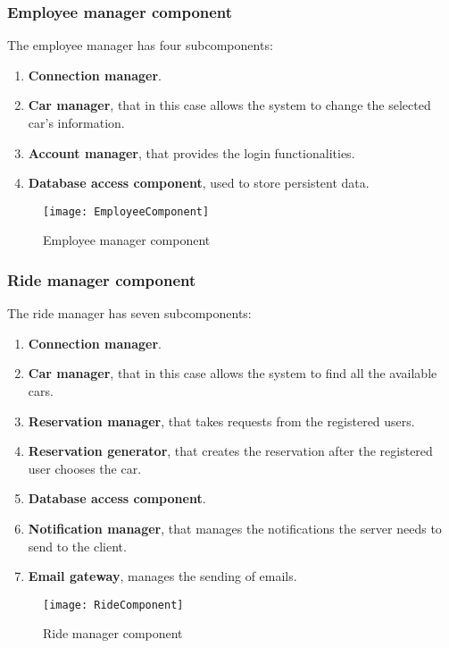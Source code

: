\subsubsection{Employee manager component}
The employee manager has four subcomponents:
\begin{enumerate}
	\item \textbf{Connection manager}.
	\item \textbf{Car manager}, that in this case allows the system to change the selected car's information.
	\item \textbf{Account manager}, that provides the login functionalities.
	\item \textbf{Database access component}, used to store persistent data.
\end{enumerate}
\begin{figure}[H]
	\centering
	\texttt{[image: EmployeeComponent]}
	\caption{Employee manager component}
\end{figure}
\newpage
\subsubsection{Ride manager component}
The ride manager has seven subcomponents:
\begin{enumerate}
	\item \textbf{Connection manager}.
	\item \textbf{Car manager}, that in this case allows the system to find all the available cars.
	\item \textbf{Reservation manager}, that takes requests from the registered users.
	\item \textbf{Reservation generator}, that creates the reservation after the registered user chooses the car.
	\item \textbf{Database access component}.
	\item \textbf{Notification manager}, that manages the notifications the server needs to send to the client.
	\item \textbf{Email gateway}, manages the sending of emails.
\end{enumerate}
\begin{figure}[H]
	\centering
	\texttt{[image: RideComponent]}
	\caption{Ride manager component}
\end{figure}
\newpage
